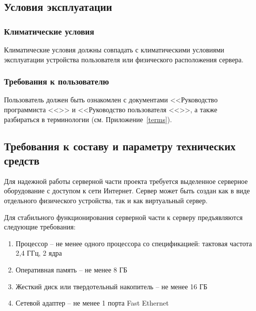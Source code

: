 \documentclass[a4paper,12pt,reqno]{article}
\begin{document}
    \subsection{Условия эксплуатации}

    \subsubsection{Климатические условия}
    Климатические условия должны совпадать с климатическими условиями эксплуатации устройства пользователя или физического расположения сервера.

    \subsubsection{Требования к пользователю}
    Пользователь должен быть ознакомлен с документами <<Руководство программиста  <<\unskip>> и <<Руководство пользователя <<\unskip>>, а также разбираться в терминологии (см. Приложение~\ref{terms}).

    \subsection{Требования к составу и параметру технических средств}
    Для надежной работы серверной части проекта требуется выделенное серверное оборудование с доступом к сети Интернет. Сервер может быть создан как в виде отдельного физического устройства, так и как виртуальный сервер.

    Для стабильного функционирования серверной части к серверу предъявляются следующие требования:
    \begin{enumerate}
        \item Процессор – не менее одного процессора со спецификацией: тактовая частота 2,4 ГГц, 2 ядра
        \item Оперативная память – не менее 8 ГБ
        \item Жесткий диск или твердотельный накопитель – не менее 16 ГБ
        \item Сетевой адаптер – не менее 1 порта Fast Ethernet
    \end{enumerate}
\end{document}
